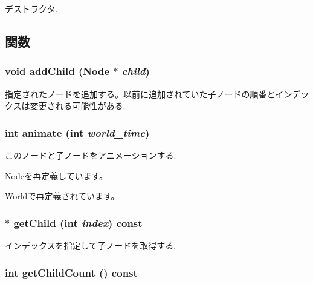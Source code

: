 デストラクタ. 

\subsection{関数}
\hypertarget{classm3g_1_1Group_f7c798f6f7924dc14403df261f82153a}{
\subsubsection[{addChild}]{\setlength{\rightskip}{0pt plus 5cm}void addChild ({\bf Node} $\ast$ {\em child})}}
\label{classm3g_1_1Group_f7c798f6f7924dc14403df261f82153a}


指定されたノードを追加する。以前に追加されていた子ノードの順番とインデックスは変更される可能性がある. \hypertarget{classm3g_1_1Group_8aad1ceab4c2a03609c8a42324ce484d}{
\subsubsection[{animate}]{\setlength{\rightskip}{0pt plus 5cm}int animate (int {\em world\_\-time})}}
\label{classm3g_1_1Group_8aad1ceab4c2a03609c8a42324ce484d}


このノードと子ノードをアニメーションする. 

\hyperlink{classm3g_1_1Node_8aad1ceab4c2a03609c8a42324ce484d}{Node}を再定義しています。

\hyperlink{classm3g_1_1World_8aad1ceab4c2a03609c8a42324ce484d}{World}で再定義されています。\hypertarget{classm3g_1_1Group_a3af7d07fde341ef751157d274538698}{
\subsubsection[{getChild}]{ $\ast$ getChild (int {\em index}) const}}
\label{classm3g_1_1Group_a3af7d07fde341ef751157d274538698}


インデックスを指定して子ノードを取得する. \hypertarget{classm3g_1_1Group_756d01dca16e146d69bb1881aca8fbb7}{
\subsubsection[{getChildCount}]{\setlength{\rightskip}{0pt plus 5cm}int getChildCount () const}}
\label{classm3g_1_1Group_756d01dca16e146d69bb1881aca8fbb7}


